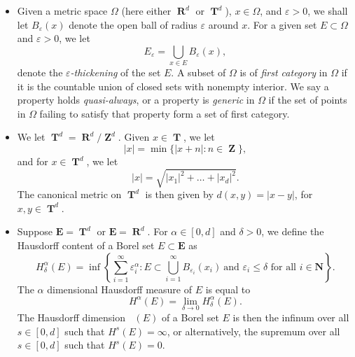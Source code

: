 \documentclass[12pt,reqno]{article}
\numberwithin{equation}{section}
\DeclareMathOperator{\hausdim}{\dim_{\mathbf{H}}}
\DeclareMathOperator{\RR}{\mathbf{R}}
\DeclareMathOperator{\ZZ}{\mathbf{Z}}
\DeclareMathOperator{\TT}{\mathbf{T}}
\begin{document}
\begin{itemize}

    \item Given a metric space $\Omega$ (here either $\RR^d$ or $\TT^d$), $x \in \Omega$, and $\varepsilon > 0$, we shall let $B_\varepsilon(x)$ denote the open ball of radius $\varepsilon$ around $x$. For a given set $E \subset \Omega$ and $\varepsilon > 0$, we let
    \[ E_\varepsilon = \bigcup_{x \in E} B_\varepsilon(x), \]
    denote the \emph{$\varepsilon$-thickening} of the set $E$. A subset of $\Omega$ is of \emph{first category} in $\Omega$ if it is the countable union of closed sets with nonempty interior. We say a property holds \emph{quasi-always}, or a property is \emph{generic} in $\Omega$ if the set of points in $\Omega$ failing to satisfy that property form a set of first category.

    \item We let $\TT^d = \RR^d/\ZZ^d$. Given $x \in \TT$, we let
    \[ |x| = \min \{ |x + n| : n \in \ZZ \}, \]
    and for $x \in \TT^d$, we let
    \[ |x| = \sqrt{|x_1|^2 + \dots + |x_d|^2}. \]
    The canonical metric on $\TT^d$ is then given by $d(x,y) = |x - y|$, for $x,y \in \TT^d$.

    \item Suppose $\mathbf{E} = \TT^d$ or $\mathbf{E} = \RR^d$. For $\alpha \in [0,d]$ and $\delta > 0$, we define the Hausdorff content of a Borel set $E \subset \mathbf{E}$ as
    \[ H^\alpha_\delta(E) = \inf \left\{ \sum_{i = 1}^\infty \varepsilon_i^\alpha : E \subset \bigcup_{i = 1}^\infty B_{\varepsilon_i}(x_i)\ \text{and $\varepsilon_i \leq \delta$ for all $i \in \mathbf{N}$} \right\}. \]
    The $\alpha$ dimensional Hausdorff measure of $E$ is equal to
    \[ H^\alpha(E) = \lim_{\delta \to 0} H^\alpha_\delta(E). \]
    The Hausdorff dimension $\hausdim(E)$ of a Borel set $E$ is then the infinum over all $s \in [0,d]$ such that $H^s(E) = \infty$, or alternatively, the supremum over all $s \in [0,d]$ such that $H^s(E) = 0$.


\end{itemize}
\end{document}
